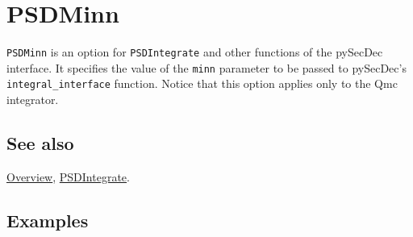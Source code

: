 \documentclass[../FeynHelpersManual.tex]{subfiles}
\begin{document}
\hypertarget{psdminn}{
\section{PSDMinn}\label{psdminn}}

\texttt{PSDMinn} is an option for \texttt{PSDIntegrate} and other
functions of the pySecDec interface. It specifies the value of the
\texttt{minn} parameter to be passed to pySecDec's
\texttt{integral_interface} function. Notice that this option applies
only to the Qmc integrator.

\subsection{See also}

\hyperlink{toc}{Overview}, \hyperlink{psdintegrate}{PSDIntegrate}.

\subsection{Examples}
\end{document}
